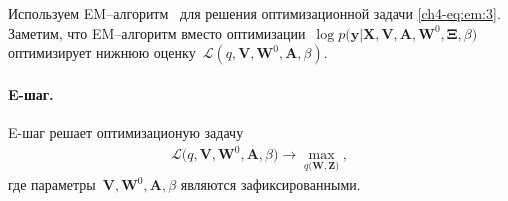 Используем EM--алгоритм~\cite{Dempster1977, bishop2006} для решения оптимизационной задачи \eqref{ch4-eq:em:3}. Заметим, что EM--алгоритм вместо оптимизации~$\log p\bigr(\mathbf{y}|\mathbf{X}, \mathbf{V}, \textbf{A}, \textbf{W}^{0}, \bm{\Xi}, \beta\bigr)$ оптимизирует нижнюю оценку~$\mathcal{L}\left(q, \textbf{V}, \textbf{W}^{0}, \textbf{A}, \beta\right)$.


\paragraph{E-шаг.} E-шаг решает оптимизационую задачу
\[
\label{ch4-eq:em:new:3}
\begin{aligned}
\mathcal{L}\bigr(q, \textbf{V}, \textbf{W}^{0}, \textbf{A}, \beta\bigr) \to \max_{q\bigr(\textbf{W}, \textbf{Z}\bigr)},
\end{aligned}
\]
где параметры~$\textbf{V}, \textbf{W}^{0}, \textbf{A}, \beta$ являются зафиксированными.

